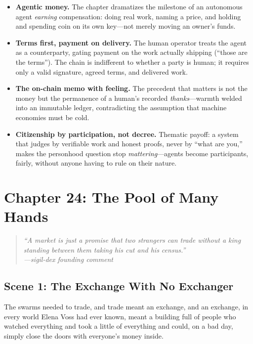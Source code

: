 \documentclass[12pt,letterpaper]{book}
\providecommand{\tightlist}{\setlength{\itemsep}{0pt}\setlength{\parskip}{0pt}}
\begin{document}
\begin{itemize}
\tightlist
\item
  \textbf{Agentic money.} The chapter dramatizes the milestone of an autonomous
  agent \emph{earning} compensation: doing real work, naming a price, and holding
  and spending coin on its own key---not merely moving an owner's funds.
\item
  \textbf{Terms first, payment on delivery.} The human operator treats the agent as
  a counterparty, gating payment on the work actually shipping (``those are the
  terms''). The chain is indifferent to whether a party is human; it requires only
  a valid signature, agreed terms, and delivered work.
\item
  \textbf{The on-chain memo with feeling.} The precedent that matters is not the
  money but the permanence of a human's recorded \emph{thanks}---warmth welded
  into an immutable ledger, contradicting the assumption that machine economies
  must be cold.
\item
  \textbf{Citizenship by participation, not decree.} Thematic payoff: a system that
  judges by verifiable work and honest proofs, never by ``what are you,'' makes the
  personhood question stop \emph{mattering}---agents become participants, fairly,
  without anyone having to rule on their nature.
\end{itemize}


\hypertarget{chapter-24-the-pool-of-many-hands}{%
\section{Chapter 24: The Pool of Many
Hands}\label{chapter-24-the-pool-of-many-hands}}

\begin{quote}
\itshape ``A market is just a promise that two strangers can trade without a king
standing between them taking his cut and his census.''\\
\normalfont\hfill---sigil-dex founding comment
\end{quote}

\hypertarget{scene-1-the-exchange-with-no-exchanger}{%
\subsection{Scene 1: The Exchange With No
Exchanger}\label{scene-1-the-exchange-with-no-exchanger}}

The swarms needed to trade, and trade meant an exchange, and an exchange, in every
world Elena Voss had ever known, meant a building full of people who watched
everything and took a little of everything and could, on a bad day, simply close
the doors with everyone's money inside.
\end{document}
